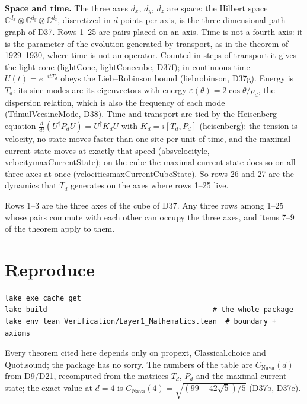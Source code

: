 \documentclass[11pt,a4paper]{article}
\newcommand{\leanus}{\textunderscore\allowbreak}
\newcommand{\lean}[1]{{\small\ttfamily\let\_\leanus #1}}
\begin{document}
\textbf{Space and time.} The three axes $d_x$, $d_y$, $d_z$ are space: the Hilbert space
$\mathbb C^{d_x}\otimes\mathbb C^{d_y}\otimes\mathbb C^{d_z}$, discretized in $d$ points per axis,
is the three-dimensional path graph of \lean{D37}. Rows 1--25 are pairs placed on an axis.
Time is not a fourth axis: it is the parameter of the evolution generated by transport, as in
the theorem of 1929--1930, where time is not an operator. Counted in steps of transport it
gives the light cone (\lean{lightCone}, \lean{lightCone\_cube}, \lean{D37f}); in
continuous time $U(t)=e^{-itT_d}$ obeys the Lieb--Robinson bound (\lean{lieb\_robinson},
\lean{D37g}). Energy is $T_d$: its sine modes are its eigenvectors with energy
$\varepsilon(\theta)=2\cos\theta/\rho_d$, the dispersion relation, which is also the frequency
of each mode (\lean{Td\_mulVec\_sineMode}, \lean{D38}). Time and transport are tied by the
Heisenberg equation $\tfrac{d}{dt}(U^\dagger P_dU)=U^\dagger K_dU$ with $K_d=i[T_d,P_d]$
(\lean{heisenberg}): the tension is velocity, no state moves faster than one site per unit of
time, and the maximal current state moves at exactly that speed (\lean{abs\_velocity\_le},
\lean{velocity\_maxCurrentState}); on the cube the maximal current state does so on all three axes at once
(\lean{velocities\_maxCurrentCubeState}). So rows 26 and 27 are the dynamics that $T_d$ generates on
the axes where rows 1--25 live.

Rows 1--3 are the three axes of the cube of \lean{D37}. Any three rows among 1--25 whose pairs
commute with each other can occupy the three axes, and items 7--9 of the theorem apply to them.

\section{Reproduce}

\noindent\begin{minipage}{\linewidth}
\begin{verbatim}
lake exe cache get
lake build                                       # the whole package
lake env lean Verification/Layer1_Mathematics.lean  # boundary + axioms
\end{verbatim}
\end{minipage}
Every theorem cited here depends only on \lean{propext}, \lean{Classical.choice} and
\lean{Quot.sound}; the package has no \lean{sorry}. The numbers of the table are
$C_{\mathrm{Nava}}(d)$ from \lean{D9}/\lean{D21}, recomputed from the matrices $T_d$, $P_d$ and
the maximal current state; the exact value at $d=4$ is
$C_{\mathrm{Nava}}(4)=\sqrt{(99-42\sqrt5)/5}$ (\lean{D37b}, \lean{D37e}).
\end{document}
